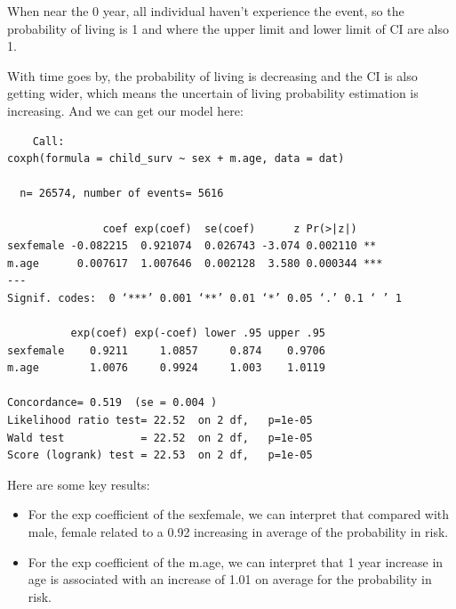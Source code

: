 \documentclass[12pt]{article} %
\begin{document}
\noindent When near the 0 year, all individual haven't experience the event, so the probability of living is 1 and where the upper limit and lower limit of CI are also 1.\\
\par
\noindent With time goes by, the probability of living is decreasing and the CI is also getting wider, which means the uncertain of living probability estimation is increasing.
\newpage
\noindent And we can get our model here:
\begin{verbatim}
	Call:
coxph(formula = child_surv ~ sex + m.age, data = dat)

  n= 26574, number of events= 5616 

               coef exp(coef)  se(coef)      z Pr(>|z|)    
sexfemale -0.082215  0.921074  0.026743 -3.074 0.002110 ** 
m.age      0.007617  1.007646  0.002128  3.580 0.000344 ***
---
Signif. codes:  0 ‘***’ 0.001 ‘**’ 0.01 ‘*’ 0.05 ‘.’ 0.1 ‘ ’ 1

          exp(coef) exp(-coef) lower .95 upper .95
sexfemale    0.9211     1.0857     0.874    0.9706
m.age        1.0076     0.9924     1.003    1.0119

Concordance= 0.519  (se = 0.004 )
Likelihood ratio test= 22.52  on 2 df,   p=1e-05
Wald test            = 22.52  on 2 df,   p=1e-05
Score (logrank) test = 22.53  on 2 df,   p=1e-05
\end{verbatim}
Here are some key results:
\begin{itemize}
	\item For the exp coefficient of the sexfemale, we can interpret that compared with male, female related to a 0.92 increasing in average of the probability in risk.
	\item For the exp coefficient of the m.age, we can interpret that 1 year increase in age is associated with an increase of 1.01 on average for the probability in risk.
\end{itemize}
\end{document}
